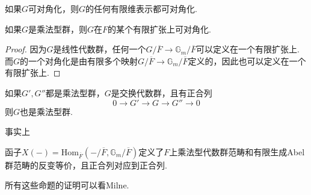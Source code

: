 \begin{cprop}
    如果$G$可对角化，则$G$的任何有限维表示都可对角化.
\end{cprop}

\begin{cprop}
    如果$G$是乘法型群，则$G$在$F$的某个有限扩张上可对角化.
\end{cprop}

\begin{proof}
    因为$G$是线性代数群，任何一个$G/\overline{F}\to \mathbb{G}_m/\overline{F}$可以定义在一个有限扩张上. 而$G$的一个对角化是由有限多个映射$G/\overline{F}\to \mathbb{G}_m/\overline{F}$定义的，因此也可以定义在一个有限扩张上.
\end{proof}

\begin{cprop}
    如果$G',G''$都是乘法型群，$G$是交换代数群，且有正合列
    \begin{equation*}
        0\to G'\to G\to G''\to 0
    \end{equation*}
    则$G$也是乘法型群.
\end{cprop}

事实上
\begin{cprop}
    函子$X(-) = \mathrm{Hom}_{\overline{F}}(-/\overline{F}, \mathbb{G}_m/\overline{F})$定义了$F$上乘法型代数群范畴和有限生成Abel群范畴的反变等价，且正合列对应到正合列.
\end{cprop}

所有这些命题的证明可以看Milne.
